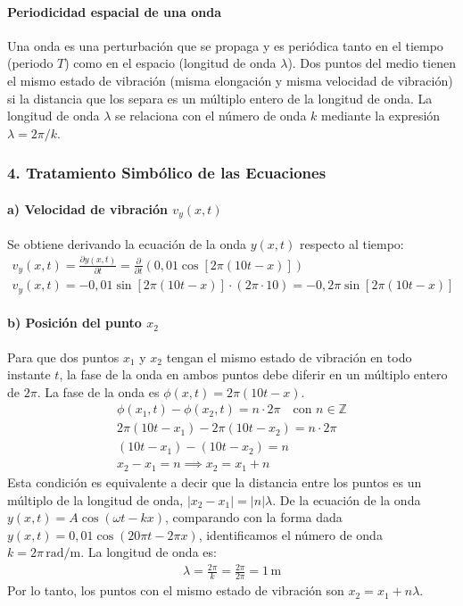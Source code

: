 \paragraph*{Periodicidad espacial de una onda} Una onda es una perturbación que se propaga y es periódica tanto en el tiempo (periodo $T$) como en el espacio (longitud de onda $\lambda$). Dos puntos del medio tienen el mismo estado de vibración (misma elongación y misma velocidad de vibración) si la distancia que los separa es un múltiplo entero de la longitud de onda. La longitud de onda $\lambda$ se relaciona con el número de onda $k$ mediante la expresión $\lambda = 2\pi/k$.

\subsubsection*{4. Tratamiento Simbólico de las Ecuaciones}
\paragraph*{a) Velocidad de vibración $v_y(x,t)$}
Se obtiene derivando la ecuación de la onda $y(x,t)$ respecto al tiempo:
\begin{gather}
    v_y(x,t) = \frac{\partial y(x,t)}{\partial t} = \frac{\partial}{\partial t} \left( 0,01 \cos[2\pi(10t - x)] \right) \nonumber \\
    v_y(x,t) = -0,01 \sin[2\pi(10t - x)] \cdot (2\pi \cdot 10) = -0,2\pi \sin[2\pi(10t - x)]
\end{gather}
\paragraph*{b) Posición del punto $x_2$}
Para que dos puntos $x_1$ y $x_2$ tengan el mismo estado de vibración en todo instante $t$, la fase de la onda en ambos puntos debe diferir en un múltiplo entero de $2\pi$.
La fase de la onda es $\phi(x,t) = 2\pi(10t - x)$.
\begin{gather}
    \phi(x_1, t) - \phi(x_2, t) = n \cdot 2\pi \quad \text{con } n \in \mathbb{Z} \nonumber \\
    2\pi(10t - x_1) - 2\pi(10t - x_2) = n \cdot 2\pi \nonumber \\
    (10t - x_1) - (10t - x_2) = n \nonumber \\
    x_2 - x_1 = n \implies x_2 = x_1 + n
\end{gather}
Esta condición es equivalente a decir que la distancia entre los puntos es un múltiplo de la longitud de onda, $|x_2 - x_1| = |n|\lambda$.
De la ecuación de la onda $y(x,t) = A \cos(\omega t - kx)$, comparando con la forma dada $y(x,t)=0,01 \cos(20\pi t - 2\pi x)$, identificamos el número de onda $k=2\pi \, \text{rad/m}$.
La longitud de onda es:
\begin{gather}
    \lambda = \frac{2\pi}{k} = \frac{2\pi}{2\pi} = 1 \, \text{m}
\end{gather}
Por lo tanto, los puntos con el mismo estado de vibración son $x_2 = x_1 + n \lambda$.

